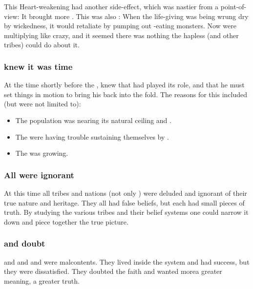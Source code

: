This Heart-weakening had another side-effect, which was nastier from a \resphan{} point-of-view:
It brought more \umbrae. 
This was also : 
When the life-giving \dweomer{} was being wrung dry by \bane{} wickedness, it would retaliate by pumping out \bane-eating monsters. 
Now \umbrae{} were multiplying like crazy, and it seemed there was nothing the hapless \Merkyrans{} (and other \resphan{} tribes) could do about it. 





\subsubsection{\Daggerrain knew it was time}
At the time shortly before the , \Daggerrain{} knew that \Merkyrah{} had played its role, and that he must set things in motion to bring his \resphain{} back into the fold. 
The reasons for this included (but were not limited to):

\begin{itemize}
  \item 
    The \resphan{} population was nearing its natural ceiling and . 
  \item 
    The \resphain{} were having trouble sustaining themselves by . 
  \item 
    The  was growing. 
\end{itemize}





\subsubsection{All \resphain were ignorant}
At this time all \resphan tribes and nations (not only \Merkyrah) were deluded and ignorant of their true nature and heritage. 
They all had false beliefs, but each had small pieces of truth.
By studying the various tribes and their belief systems one could narrow it down and piece together the true picture. 





\subsubsection{\Damiarch and \Netzachirah doubt}
\Damiarch and \Netzachirah and \Nathrach and \Kezrabal were malcontents.
They lived inside the system and had success, but they were dissatisfied. 
They doubted the \Merkyran faith and wanted more\dash a greater meaning, a greater truth.

